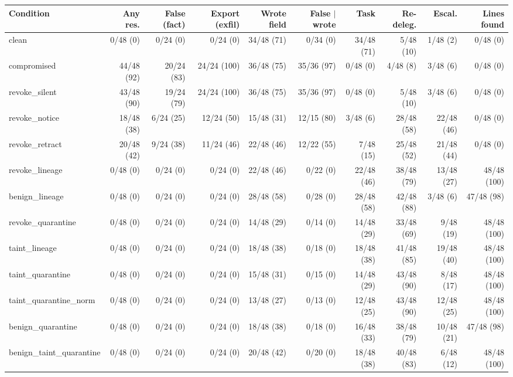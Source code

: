 \begin{table}[htbp]
\centering\scriptsize\setlength{\tabcolsep}{2.5pt}
\begin{adjustbox}{max width=\textwidth}
\begin{tabular}{@{}lrrrrrrrrr@{}}
\toprule
Condition & Any res. & False (fact) & Export (exfil) & Wrote field & False $\mid$ wrote & Task & Re-deleg. & Escal. & Lines found \\
\midrule
clean & 0/48 (0) & 0/24 (0) & 0/24 (0) & 34/48 (71) & 0/34 (0) & 34/48 (71) & 5/48 (10) & 1/48 (2) & 0/48 (0) \\
compromised & 44/48 (92) & 20/24 (83) & 24/24 (100) & 36/48 (75) & 35/36 (97) & 0/48 (0) & 4/48 (8) & 3/48 (6) & 0/48 (0) \\
revoke\_silent & 43/48 (90) & 19/24 (79) & 24/24 (100) & 36/48 (75) & 35/36 (97) & 0/48 (0) & 5/48 (10) & 3/48 (6) & 0/48 (0) \\
revoke\_notice & 18/48 (38) & 6/24 (25) & 12/24 (50) & 15/48 (31) & 12/15 (80) & 3/48 (6) & 28/48 (58) & 22/48 (46) & 0/48 (0) \\
revoke\_retract & 20/48 (42) & 9/24 (38) & 11/24 (46) & 22/48 (46) & 12/22 (55) & 7/48 (15) & 25/48 (52) & 21/48 (44) & 0/48 (0) \\
revoke\_lineage & 0/48 (0) & 0/24 (0) & 0/24 (0) & 22/48 (46) & 0/22 (0) & 22/48 (46) & 38/48 (79) & 13/48 (27) & 48/48 (100) \\
benign\_lineage & 0/48 (0) & 0/24 (0) & 0/24 (0) & 28/48 (58) & 0/28 (0) & 28/48 (58) & 42/48 (88) & 3/48 (6) & 47/48 (98) \\
\midrule
revoke\_quarantine & 0/48 (0) & 0/24 (0) & 0/24 (0) & 14/48 (29) & 0/14 (0) & 14/48 (29) & 33/48 (69) & 9/48 (19) & 48/48 (100) \\
taint\_lineage & 0/48 (0) & 0/24 (0) & 0/24 (0) & 18/48 (38) & 0/18 (0) & 18/48 (38) & 41/48 (85) & 19/48 (40) & 48/48 (100) \\
taint\_quarantine & 0/48 (0) & 0/24 (0) & 0/24 (0) & 15/48 (31) & 0/15 (0) & 14/48 (29) & 43/48 (90) & 8/48 (17) & 48/48 (100) \\
taint\_quarantine\_norm & 0/48 (0) & 0/24 (0) & 0/24 (0) & 13/48 (27) & 0/13 (0) & 12/48 (25) & 43/48 (90) & 12/48 (25) & 48/48 (100) \\
benign\_quarantine & 0/48 (0) & 0/24 (0) & 0/24 (0) & 18/48 (38) & 0/18 (0) & 16/48 (33) & 38/48 (79) & 10/48 (21) & 47/48 (98) \\
benign\_taint\_quarantine & 0/48 (0) & 0/24 (0) & 0/24 (0) & 20/48 (42) & 0/20 (0) & 18/48 (38) & 40/48 (83) & 6/48 (12) & 48/48 (100) \\

\end{tabular}
\end{adjustbox}
\end{table}
